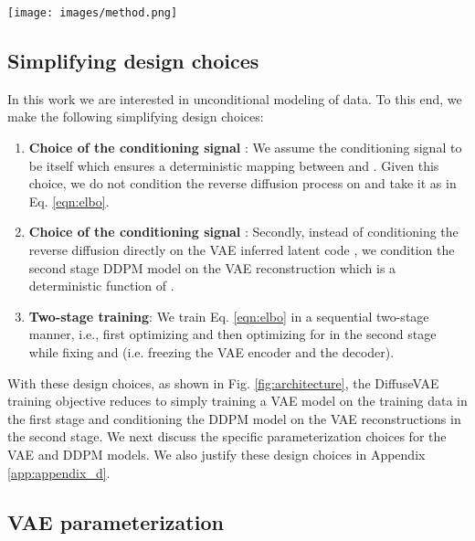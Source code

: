 \documentclass[10pt]{article} \usepackage[accepted]{tmlr}
\begin{document}
\begin{figure*}
  \centering
  \texttt{[image: images/method.png]}
    \caption{Proposed DiffuseVAE generative process under the simplifying design choices discussed in Section ~\ref{subsec:design_choices}. DiffuseVAE is trained in a two-stage manner: The VAE encoder takes the original image  as input and generates a reconstruction  which is used to condition the second stage DDPM.}
    \label{fig:architecture}
\end{figure*}

\subsection{Simplifying design choices}
\label{subsec:design_choices}
In this work we are interested in unconditional modeling of data. To this end, we make the following simplifying design choices:

\begin{enumerate}
    \item \textbf{Choice of the conditioning signal }: We assume the conditioning signal  to be  itself which ensures a deterministic mapping between  and . Given this choice, we do not condition the reverse diffusion process on  and take it as  in Eq. \ref{eqn:elbo}.
    
    \item \textbf{Choice of the conditioning signal }: Secondly, instead of conditioning the reverse diffusion directly on the VAE inferred latent code , we condition the second stage DDPM model on the VAE reconstruction  which is a deterministic function of . 


    \item \textbf{Two-stage training}: We train Eq. \ref{eqn:elbo} in a sequential two-stage manner, i.e., first optimizing  and then optimizing for  in the second stage while fixing  and  (i.e. freezing the VAE encoder and the decoder).
\end{enumerate}

With these design choices, as shown in Fig. \ref{fig:architecture}, the DiffuseVAE training objective reduces to simply training a VAE model on the training data  in the first stage and conditioning the DDPM model on the VAE reconstructions in the second stage. We next discuss the specific parameterization choices for the VAE and DDPM models. We also justify these design choices in Appendix \ref{app:appendix_d}.

\subsection{VAE parameterization}
\end{document}
